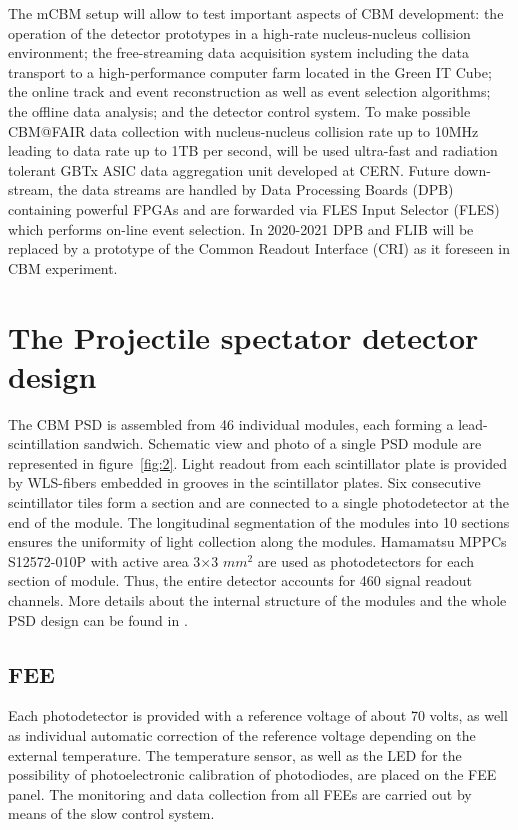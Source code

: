 \documentclass[a4paper,11pt]{article}
\begin{document}
The mCBM setup will allow to test important aspects of CBM development: the operation of the detector prototypes in a high-rate nucleus-nucleus collision environment; the free-streaming data acquisition system including the data transport to a high-performance computer farm located in the Green IT Cube; the online track and event reconstruction as well as event selection algorithms; the offline data analysis; and the detector control system.
To make possible CBM@FAIR data collection with nucleus-nucleus collision rate up to 10MHz leading to data rate up to 1TB per second, will be used ultra-fast and radiation tolerant GBTx ASIC data aggregation unit developed at CERN. Future down-stream, the data streams are handled by Data Processing Boards (DPB) containing powerful FPGAs and are forwarded via FLES Input Selector (FLES) which performs on-line event selection. In 2020-2021 DPB and FLIB will be replaced by a prototype of the Common Readout Interface (CRI) as it foreseen in CBM experiment.\cite{1}



\section{The Projectile spectator detector design}
The CBM PSD is assembled from 46 individual modules, each forming a lead-scintillation sandwich. Schematic view and photo of a single PSD module are represented in figure~\ref{fig:2}. Light readout from each scintillator plate is provided by WLS-fibers embedded in grooves in the scintillator plates. Six consecutive scintillator tiles form a section and are connected to a single photodetector at the end of the module. The longitudinal segmentation of the modules into 10 sections ensures the uniformity of light collection along the modules. Hamamatsu MPPCs S12572-010P with active area 3$\times$3 $mm^2$ are used as photodetectors for each section of module. Thus, the entire detector accounts for 460 signal readout channels. More details about the internal structure of the modules and the whole PSD design can be found in \cite{2}.


\subsection{FEE}
Each photodetector is provided with a reference voltage of about 70 volts, as well as individual automatic correction of the reference voltage depending on the external temperature. The temperature sensor, as well as the LED for the possibility of photoelectronic calibration of photodiodes, are placed on the FEE panel. The monitoring and data collection from all FEEs are carried out by means of the slow control system.
\end{document}
